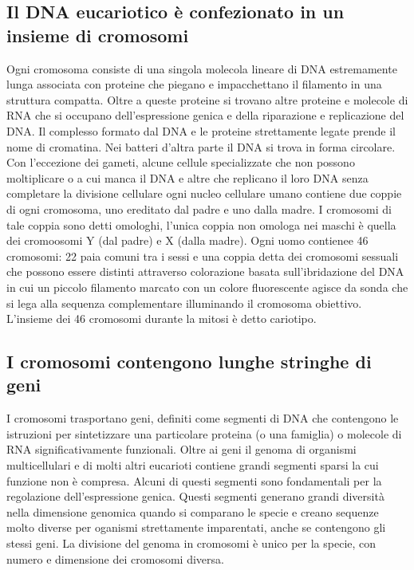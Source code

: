 \subsection{Il DNA eucariotico \`e confezionato in un insieme di cromosomi}
Ogni cromosoma consiste di una singola molecola lineare di DNA estremamente lunga associata con proteine che piegano e impacchettano il filamento in una struttura compatta. Oltre a 
queste proteine si trovano altre proteine e molecole di RNA che si occupano dell'espressione genica e della riparazione e replicazione del DNA. Il complesso formato dal DNA e le proteine
strettamente legate prende il nome di cromatina. Nei batteri d'altra parte il DNA si trova in forma circolare. Con l'eccezione dei gameti, alcune cellule specializzate che non possono
moltiplicare o a cui manca il DNA e altre che replicano il loro DNA senza completare la divisione cellulare ogni nucleo cellulare umano contiene due coppie di ogni cromosoma, uno 
ereditato dal padre e uno dalla madre. I cromosomi di tale coppia sono detti omologhi, l'unica coppia non omologa nei maschi \`e quella dei cromoosomi Y (dal padre) e X (dalla madre).
Ogni uomo contienee 46 cromosomi: 22 paia comuni tra i sessi e una coppia detta dei cromosomi sessuali che possono essere distinti attraverso colorazione basata sull'ibridazione del DNA
in cui un piccolo filamento marcato con un colore fluorescente agisce da sonda che si lega alla sequenza complementare illuminando il cromosoma obiettivo. L'insieme dei 46 cromosomi
durante la mitosi \`e detto cariotipo.
\subsection{I cromosomi contengono lunghe stringhe di geni}
I cromosomi trasportano geni, definiti come segmenti di DNA che contengono le istruzioni per sintetizzare una particolare proteina (o una famiglia) o molecole di RNA significativamente 
funzionali. Oltre ai geni il genoma di organismi multicellulari e di molti altri eucarioti contiene grandi segmenti sparsi la cui funzione non \`e compresa. Alcuni di questi segmenti
sono fondamentali per la regolazione dell'espressione genica. Questi segmenti generano grandi diversit\`a nella dimensione genomica quando si comparano le specie e creano sequenze molto
diverse per oganismi strettamente imparentati, anche se contengono gli stessi geni. La divisione del genoma in cromosomi \`e unico per la specie, con numero e dimensione dei cromosomi
diversa. 
